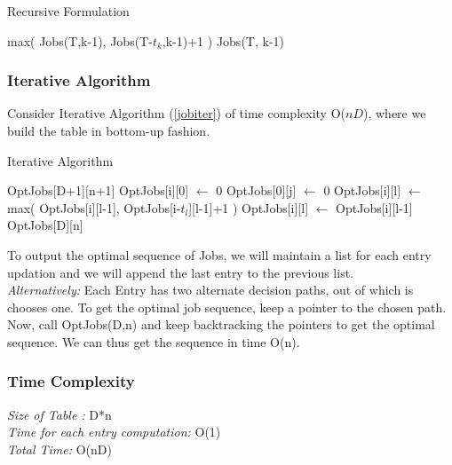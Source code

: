 \documentclass{article}
\begin{document}
\begin{algorithm}[h!]
\caption{Recursive Formulation}
\label{job}
\begin{algorithmic}[1]
\State {}
\EndIf
{}
\State \Return  max( Jobs(T,k-1),  Jobs(T-$t_k$,k-1)+1 ) 
\Else
\State \Return Jobs(T, k-1)
\EndIf
\EndProcedure
\end{algorithmic}
\end{algorithm}
\newpage
\subsubsection{Iterative Algorithm}
\label{iter}
Consider Iterative Algorithm (\ref{jobiter}) of time complexity O($nD$), where we build the table in bottom-up fashion.
\begin{algorithm}
\caption{Iterative Algorithm}
\label{jobiter}
\begin{algorithmic}[1]
\State OptJobs[D+1][n+1] 
\State OptJobs[i][0] $\gets$ 0
\EndFor
{}
\State OptJobs[0][j] $\gets$ 0
\EndFor
{}
\State OptJobs[i][l] $\gets$ max( OptJobs[i][l-1],  OptJobs[i-$t_l$][l-1]+1 )
\Else
\State OptJobs[i][l] $\gets$ OptJobs[i][l-1]
\EndIf
\EndFor
\EndFor
\State \Return OptJobs[D][n]
\EndProcedure
\end{algorithmic}
\end{algorithm}
\par To output the optimal sequence of Jobs, we will maintain a list for each entry updation and we will append the last entry to the previous list. \\
\emph{Alternatively: }Each Entry has two alternate decision paths, out of which is chooses one. To get the optimal job sequence, keep a pointer to the chosen path. Now, call OptJobs(D,n) and keep backtracking the pointers to get the optimal sequence. We can thus get the sequence in time O(n).

\subsubsection{Time Complexity}
\emph{Size of Table :} D*n \\
\emph{Time for each entry computation: }O(1)\\
\emph{Total Time: } O(nD)  
\end{document}
